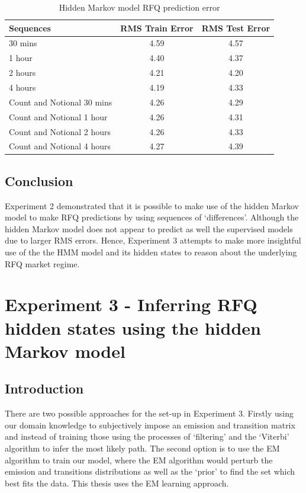 \begin{table}[!ht]\centering\small
    \caption{Hidden Markov model RFQ prediction error}\label{Ch4Fig:hmm_predict_error}
    \begin{tabular}{lcc}
        \toprule
            Sequences  & RMS Train Error & RMS Test Error \\
        \midrule
            30 mins                    & 4.59 & 4.57 \\
            1 hour                     & 4.40 & 4.37 \\
            2 hours                    & 4.21 & 4.20 \\
            4 hours                    & 4.19 & 4.33 \\
            Count and Notional 30 mins & 4.26 & 4.29 \\
            Count and Notional 1 hour  & 4.26 & 4.31 \\
            Count and Notional 2 hours & 4.26 & 4.33 \\
            Count and Notional 4 hours & 4.27 & 4.39 \\
        \bottomrule
    \end{tabular}
\end{table}

\subsection{Conclusion}

Experiment 2 demonstrated that it is possible to make use of the hidden Markov model to make RFQ predictions by using sequences of `differences'. Although the hidden Markov model does not appear to predict as well the supervised models due to larger RMS errors. Hence, Experiment 3 attempts to make more insightful use of the the HMM model and its hidden states to reason about the underlying RFQ market regime.

\section{Experiment 3 - Inferring RFQ hidden states using the hidden Markov model}

\subsection{Introduction}

There are two possible approaches for the set-up in Experiment 3. Firstly using our domain knowledge to subjectively impose an emission and transition matrix and instead of training those using the processes of `filtering' and the `Viterbi' algorithm to infer the most likely path. The second option is to use the EM algorithm to train our model, where the EM algorithm would perturb the emission and transitions distributions as well as the `prior' to find the set which best fits the data. This thesis uses the EM learning approach.

